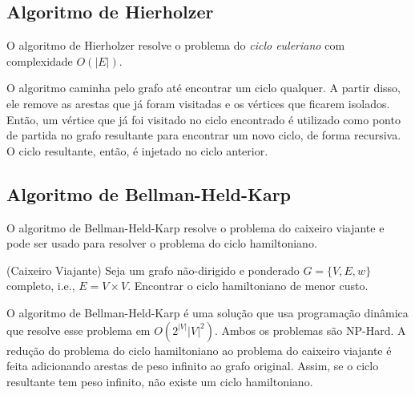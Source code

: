 \subsection*{Algoritmo de Hierholzer}

O algoritmo de Hierholzer resolve o problema do \emph{ciclo euleriano} com complexidade $O\left( \left| E \right|  \right) $.

\begin{intuition}
    O algoritmo caminha pelo grafo até encontrar um ciclo qualquer. A partir disso, ele remove as arestas que já foram visitadas e os vértices que ficarem isolados. Então, um vértice que já foi visitado no ciclo encontrado é utilizado como ponto de partida no grafo resultante para encontrar um novo ciclo, de forma recursiva. O ciclo resultante, então, é injetado no ciclo anterior.
\end{intuition}

\subsection*{Algoritmo de Bellman-Held-Karp}

O algoritmo de Bellman-Held-Karp resolve o problema do caixeiro viajante e pode ser usado para resolver o problema do ciclo hamiltoniano.

\begin{problem}
    (Caixeiro Viajante) Seja um grafo não-dirigido e ponderado $G=\{V,E,w\} $ completo, i.e., $E=V\times V$. Encontrar o ciclo hamiltoniano de menor custo.
\end{problem}

O algoritmo de Bellman-Held-Karp é uma solução que usa programação dinâmica que resolve esse problema em $O\left( 2^{\left| V \right|} \left| V \right|^2 \right) $. Ambos os problemas são NP-Hard. A redução do problema do ciclo hamiltoniano ao problema do caixeiro viajante é feita adicionando arestas de peso infinito ao grafo original. Assim, se o ciclo resultante tem peso infinito, não existe um ciclo hamiltoniano.

